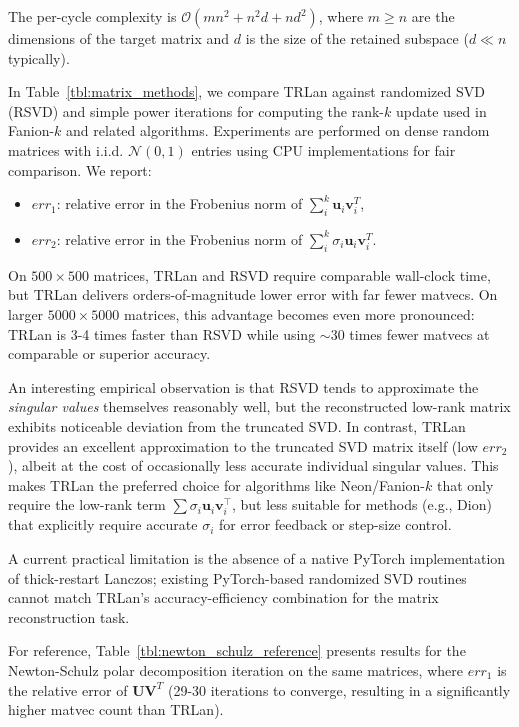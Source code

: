 \documentclass[a4paper,14pt,oneside]{extarticle}
\newcommand{\vu}{\mathbf{u}}
\newcommand{\vv}{\mathbf{v}}
\newcommand{\mU}{\mathbf{U}}
\newcommand{\mV}{\mathbf{V}}
\newcommand{\tableref}[1]{Table~\ref{#1}}
\begin{document}
The per-cycle complexity is $\mathcal{O}(mn^2 + n^2d + nd^2)$, where $m \geq n$ are the dimensions of the target matrix and $d$ is the size of the retained subspace ($d \ll n$ typically).

In \tableref{tbl:matrix_methods}, we compare TRLan against randomized SVD (RSVD) and simple power iterations for computing the rank-$k$ update used in Fanion-$k$ and related algorithms. Experiments are performed on dense random matrices with i.i.d. $\mathcal{N}(0,1)$ entries using CPU implementations for fair comparison.
We report:
\begin{itemize}
  \item $err_1$: relative error in the Frobenius norm of $\sum_i^k \vu_i \vv_i^T$,
  \item $err_2$: relative error in the Frobenius norm of $\sum_i^k \sigma_i \vu_i \vv_i^T$.
\end{itemize}

On $500\times500$ matrices, TRLan and RSVD require comparable wall-clock time, but TRLan delivers orders-of-magnitude lower error with far fewer matvecs. On larger $5000\times5000$ matrices, this advantage becomes even more pronounced: TRLan is 3-4 times faster than RSVD while using $\sim$30 times fewer matvecs at comparable or superior accuracy.

An interesting empirical observation is that RSVD tends to approximate the \emph{singular values} themselves reasonably well, but the reconstructed low-rank matrix exhibits noticeable deviation from the truncated SVD. In contrast, TRLan provides an excellent approximation to the truncated SVD matrix itself (low $err_2$), albeit at the cost of occasionally less accurate individual singular values. This makes TRLan the preferred choice for algorithms like Neon/Fanion-$k$ that only require the low-rank term $\sum \sigma_i \vu_i \vv_i^\top$, but less suitable for methods (e.g., Dion) that explicitly require accurate $\sigma_i$ for error feedback or step-size control.

A current practical limitation is the absence of a native PyTorch implementation of thick-restart Lanczos; existing PyTorch-based randomized SVD routines cannot match TRLan's accuracy-efficiency combination for the matrix reconstruction task.

For reference, \tableref{tbl:newton_schulz_reference} presents results for the Newton-Schulz polar decomposition iteration on the same matrices, where $err_1$ is the relative error of $\mU\mV^T$ (29-30 iterations to converge, resulting in a significantly higher matvec count than TRLan).
\end{document}
